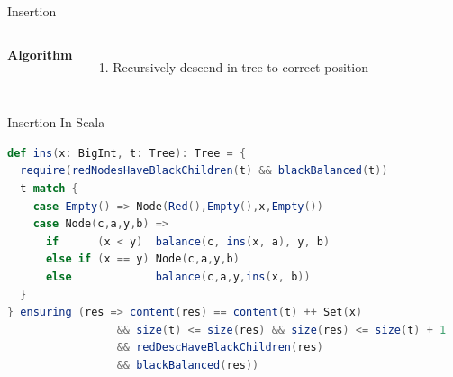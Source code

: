 \begin{frame}{Insertion}
\begin{columns}[T]
\textbf{Algorithm}
\begin{enumerate}
  \item Recursively descend in tree to correct position
\end{enumerate}

\centering
{}
\end{columns}
\end{frame}

\begin{frame}[fragile]{Insertion}
In Scala
\begin{lstlisting}[language=Scala, basicstyle=\footnotesize\ttfamily]
def ins(x: BigInt, t: Tree): Tree = {
  require(redNodesHaveBlackChildren(t) && blackBalanced(t))
  t match {
    case Empty() => Node(Red(),Empty(),x,Empty())
    case Node(c,a,y,b) =>
      if      (x < y)  balance(c, ins(x, a), y, b)
      else if (x == y) Node(c,a,y,b)
      else             balance(c,a,y,ins(x, b))
  }
} ensuring (res => content(res) == content(t) ++ Set(x)
                 && size(t) <= size(res) && size(res) <= size(t) + 1
                 && redDescHaveBlackChildren(res)
                 && blackBalanced(res))
\end{lstlisting}
\end{frame}

